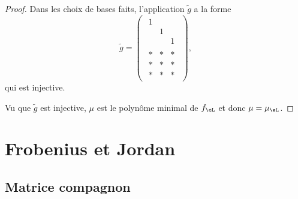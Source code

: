 \begin{proof}
    Dans les choix de bases faits, l'application \( \tilde g\) a la forme
    \begin{equation}
        \tilde g=\begin{pmatrix}
            \begin{matrix}
                1    &       &       \\
                    &   1    &       \\
                    &       &   1
            \end{matrix}\\
            \begin{matrix}
                *    &   *    &   *    \\
                *    &   *    &   *    \\
                *    &   *    &   *
            \end{matrix}
        \end{pmatrix},
    \end{equation}
    qui est injective.

    Vu que \( \tilde g\) est injective, \( \mu\) est le polynôme minimal de \( f_{\eL}\) et donc \( \mu=\mu_{\eL}\).
\end{proof}

\section{Frobenius et Jordan}

\subsection{Matrice compagnon}


